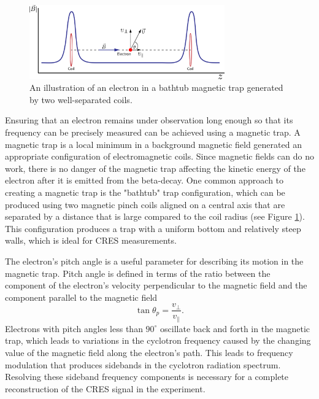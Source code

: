 \begin{figure}[htbp]
    \centering
    \includegraphics*[width=0.75\textwidth]{figs/Chapter-3/230628_bathtub_trap.png}
    \caption{\label{fig:chap3-bathtub-trap}An illustration of an electron in a bathtub magnetic trap generated by two well-separated coils.}
\end{figure}

Ensuring that an electron remains under observation long enough so that its frequency can be precisely measured can be achieved using a magnetic trap. A magnetic trap is a local minimum in a background magnetic field generated an appropriate configuration of electromagnetic coils. Since magnetic fields can do no work, there is no danger of the magnetic trap affecting the kinetic energy of the electron after it is emitted from the beta-decay. One common approach to creating a magnetic trap is the "bathtub" trap configuration, which can be produced using two magnetic pinch coils aligned on a central axis that are separated by a distance that is large compared to the coil radius (see Figure \ref{fig:chap3-bathtub-trap}). This configuration produces a trap with a uniform bottom and relatively steep walls, which is ideal for CRES measurements. 

The electron's pitch angle is a useful parameter for describing its motion in the magnetic trap. Pitch angle is defined in terms of the ratio between the component of the electron's velocity perpendicular to the magnetic field and the component parallel to the magnetic field
\begin{equation}
    \tan{\theta_p}=\frac{v_\perp}{v_\parallel}.
\end{equation}
Electrons with pitch angles less than $90^\circ$ oscillate back and forth in the magnetic trap, which leads to variations in the cyclotron frequency caused by the changing value of the magnetic field along the electron's path. This leads to frequency modulation that produces sidebands in the cyclotron radiation spectrum. Resolving these sideband frequency components is necessary for a complete reconstruction of the CRES signal in the experiment.


